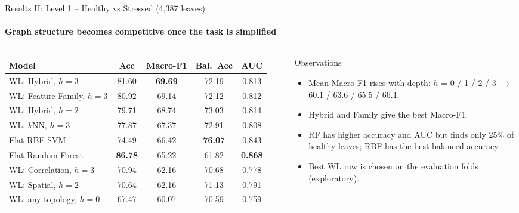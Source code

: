 \documentclass[aspectratio=169, 11pt]{beamer}
\begin{document}
\begin{frame}{Results II: Level 1 -- Healthy vs Stressed (4,387 leaves)}
    \framesubtitle{Graph structure becomes competitive once the task is simplified}
    \begin{columns}[c]
        \scriptsize
        \renewcommand{\arraystretch}{1.12}
        \begin{tabular}{@{}lcccc@{}}
            \toprule
            \textbf{Model} & \textbf{Acc} & \textbf{Macro-F1} & \textbf{Bal.\ Acc} & \textbf{AUC} \\
            \midrule
            WL: Hybrid, $h=3$ & 81.60 & \textbf{69.69} & 72.19 & 0.813 \\
            WL: Feature-Family, $h=3$ & 80.92 & 69.14 & 72.12 & 0.812 \\
            WL: Hybrid, $h=2$ & 79.71 & 68.74 & 73.03 & 0.814 \\
            WL: $k$NN, $h=3$ & 77.87 & 67.37 & 72.91 & 0.808 \\
            Flat RBF SVM & 74.49 & 66.42 & \textbf{76.07} & 0.843 \\
            Flat Random Forest & \textbf{86.78} & 65.22 & 61.82 & \textbf{0.868} \\
            WL: Correlation, $h=3$ & 70.94 & 62.16 & 70.68 & 0.778 \\
            WL: Spatial, $h=2$ & 70.64 & 62.16 & 71.13 & 0.791 \\
            WL: any topology, $h=0$ & 67.47 & 60.07 & 70.59 & 0.759 \\
            \bottomrule
        \end{tabular}

        \begin{block}{Observations}
            \scriptsize
            \begin{itemize}
                \item Mean Macro-F1 rises with depth: $h$ = 0 / 1 / 2 / 3 $\rightarrow$ 60.1 / 63.6 / 65.5 / 66.1.
                \item Hybrid and Family give the best Macro-F1.
                \item RF has higher accuracy and AUC but finds only 25\% of healthy leaves; RBF has the best balanced accuracy.
                \item Best WL row is chosen on the evaluation folds (exploratory).
            \end{itemize}
        \end{block}
    \end{columns}
\end{frame}
\end{document}
